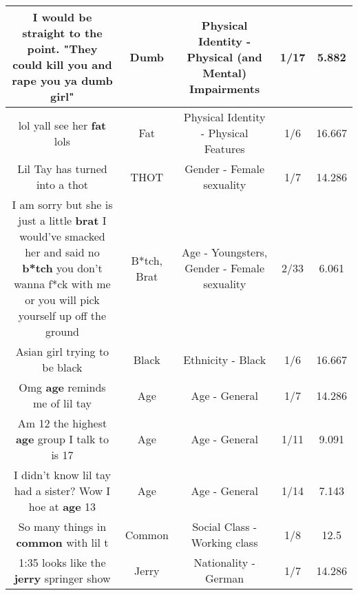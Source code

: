 \documentclass[11pt]{article}
\newlength\mylength
\begin{document}
\begin{center}
\begin{longtable}{|C{.65\mylength}|C{.30\mylength}|C{.12\mylength}|C{.12\mylength}|C{.12\mylength}|}
  \small I would be straight to the point. "They could kill you and rape you ya \textbf{dumb} girl"\normalsize   & Dumb & Physical Identity - Physical (and Mental) Impairments & 1/17 & 5.882 \\  \hline
  \small lol yall see her \textbf{fat} lols\normalsize   & Fat & Physical Identity - Physical Features & 1/6 & 16.667 \\  \hline
  \small Lil Tay has turned into a thot\normalsize   & THOT & Gender - Female sexuality & 1/7 & 14.286 \\  \hline
  \small I am sorry but she is just a little \textbf{brat} I would've smacked her and said no \textbf{b*tch} you don't wanna f*ck with me or you will pick yourself up off the ground\normalsize   & B*tch, Brat & Age - Youngsters, Gender - Female sexuality & 2/33 & 6.061 \\  \hline
  \small Asian girl trying to be black\normalsize   & Black & Ethnicity - Black & 1/6 & 16.667 \\  \hline
  \small Omg \textbf{age} reminds me of lil tay\normalsize   & Age & Age - General & 1/7 & 14.286 \\  \hline
  \small Am 12 the highest \textbf{age} group I talk to is 17\normalsize   & Age & Age - General & 1/11 & 9.091 \\  \hline
  \small I didn't know lil tay had a sister? Wow I hoe at \textbf{age} 13\normalsize   & Age & Age - General & 1/14 & 7.143 \\  \hline
  \small So many things in \textbf{common} with lil t\normalsize   & Common & Social Class - Working class & 1/8 & 12.5 \\  \hline
  \small 1:35 looks like the \textbf{jerry} springer show\normalsize   & Jerry & Nationality - German & 1/7 & 14.286 \\  \hline

\end{longtable}
\end{center}
\end{document}
